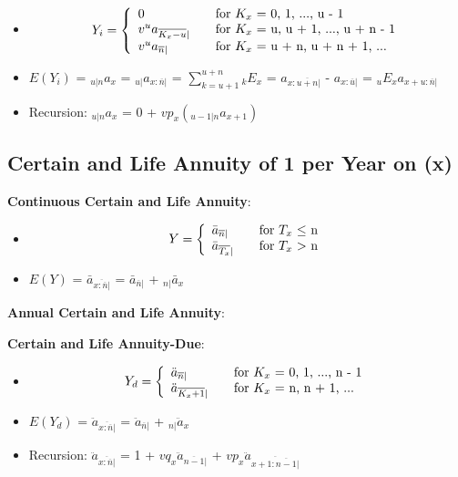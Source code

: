 \documentclass[]{book}
\begin{document}
\begin{itemize}
\item
  \[Y_i = \left\{
    \begin{array}{l l l}
      0                      & \quad \text{for $K_x$ = 0, 1, ..., u - 1}\\
      v^u a_{\overline{K_x - u}|}                 & \quad \text{for $K_x$ = u, u + 1, ..., u + n - 1}\\
      v^u a_{\overline{n}|}                       & \quad \text{for $K_x$ = u + n, u + n + 1, ...}\\
    \end{array} \right.\]
\item
  \(E(Y_i)\) = \({}_{u|n}a_x\) = \({}_{u|}a_{x :\overline{n}|}\) =
  \(\sum^{u + n}_{k = u + 1} {}_{k}E_x\) = \(a_{x :\overline{u + n}|}\)
  - \(a_{x :\overline{u}|}\) = \({}_{u}E_x\)\(a_{x + u :\overline{n}|}\)
\item
  Recursion: \({}_{u|n}a_x\) = 0 + \(vp_x({}_{u - 1|n}a_{x + 1})\)
\end{itemize}

\subsection{Certain and Life Annuity of 1 per Year on
(x)}\label{certain-and-life-annuity-of-1-per-year-on-x}

\textbf{Continuous Certain and Life Annuity}:

\begin{itemize}
\item
  \[Y = \left\{
    \begin{array}{l l}
      \bar{a}_{\overline{n}|}               & \quad \text{for $T_x$ $\le$ n}\\
      \bar{a}_{\overline{T_x}|}         & \quad \text{for $T_x$ $>$ n}\\
    \end{array} \right.\]
\item
  \(E(Y)\) = \(\bar{a}_{\overline{x: \overline{n}|}}\) =
  \(\bar{a}_{\overline{n}|}\) + \({}_{n|}\bar{a}_x\)
\end{itemize}

\textbf{Annual Certain and Life Annuity}:

\textbf{Certain and Life Annuity-Due}:

\begin{itemize}
\item
  \[Y_d = \left\{
    \begin{array}{l l}
      \ddot{a}_{\overline{n}|}               & \quad \text{for $K_x$ = 0, 1, ..., n - 1}\\
      \ddot{a}_{\overline{K_x + 1}|}         & \quad \text{for $K_x$ = n, n + 1, ...}\\
    \end{array} \right.\]
\item
  \(E(Y_d)\) = \(\ddot{a}_{\overline{x: \overline{n}|}}\) =
  \(\ddot{a}_{\overline{n}|}\) + \({}_{n|}\ddot{a}_x\)
\item
  Recursion: \(\ddot{a}_{\overline{x: \overline{n}|}}\) = 1 +
  \(vq_x\ddot{a}_{\overline{n - 1}|}\) +
  \(vp_x\ddot{a}_{\overline{x + 1: \overline{n - 1}|}}\)
\end{itemize}
\end{document}
